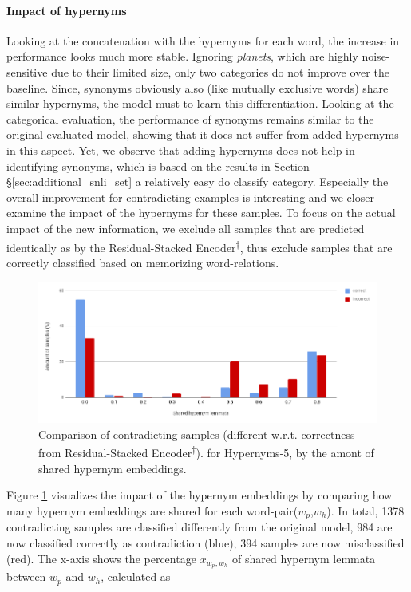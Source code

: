 \paragraph*{Impact of hypernyms}
Looking at the concatenation with the hypernyms for each word, the increase in performance looks much more stable. Ignoring \textit{planets}, which are highly noise-sensitive due to their limited size, only two categories do not improve over the baseline. Since, synonyms obviously also (like mutually exclusive words) share similar hypernyms, the model must to learn this differentiation. Looking at the categorical evaluation, the performance of synonyms remains similar to the original evaluated model, showing that it does not suffer from added hypernyms in this aspect. Yet, we observe that adding hypernyms does not help in identifying synonyms, which is based on the results in Section §\ref{sec:additional_snli_set} a relatively easy do classify category. Especially the overall improvement for contradicting examples is interesting and we closer examine the impact of the hypernyms for these samples. To focus on the actual impact of the new information, we exclude all samples that are predicted identically as by the Residual-Stacked Encoder\textsuperscript{$\dagger$}, thus exclude samples that are correctly classified based on memorizing word-relations. 
\begin{figure}[tph!]
\centering
	\includegraphics[totalheight=5.5cm]{fig/analyse_hypern5.png}
	\caption{Comparison of contradicting samples (different w.r.t. correctness from Residual-Stacked Encoder\textsuperscript{$\dagger$}). for Hypernyms-5, by the amont of shared hypernym embeddings.}
	\label{fig:analyse_hypern5}
\end{figure}
Figure \ref{fig:analyse_hypern5} visualizes the impact of the hypernym embeddings by comparing how many hypernym embeddings are shared for each word-pair($w_p$,$w_h$). In total, 1378 contradicting samples are classified differently from the original model, 984 are now classified correctly as contradiction (blue), 394 samples are now misclassified (red). The x-axis shows the percentage $x_{w_p,w_h}$ of shared hypernym lemmata between $w_p$ and $w_h$, calculated as 
